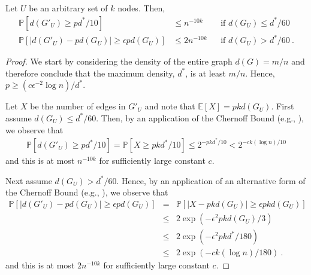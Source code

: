 \documentclass[11pt]{article}
\newcommand{\expec}[1]{\mathbb E\left [ #1 \right ]}
\newcommand{\prob}[1]{\mathbb P \left [ #1 \right ]}
\begin{document}
\begin{lemma}
\label{lem:ld}
Let $U$ be an arbitrary set of $k$ nodes. Then, 
\begin{align*}
\prob{d(G'_U)\geq pd^*/10} & \leq  n^{-10k}    & & \mbox{if $d(G_U)\leq d^*/60$}\\
\prob{|d(G'_U)-pd(G_U)|  \geq  \epsilon p d(G_U) } & \leq  2n^{-10k}     & & \mbox{if $d(G_U)> d^*/60$} \ . 
\end{align*}

\end{lemma}
\begin{proof}
We start by considering the density of the entire graph $d(G)=m/n$ and therefore conclude that the maximum density, $d^*$, is at least $m/n$. Hence, $p\geq  (c \epsilon^{-2} \log n)/d^*$.



Let $X$ be the number of edges in $G'_U$ and note that $\expec{X}= pkd(G_U)$. First assume $d(G_U)\leq d^*/60$. Then, by an application of the Chernoff Bound (e.g., \cite[Theorem 4.4]{MitzenmacherE05}), we observe that
\begin{eqnarray*}
\prob{d(G'_U)\geq  p d^*/10} 
= \prob{X\geq  pkd^*/10} 
\leq  2^{-pkd^*/10} 
<  2^{-c k(\log n)/10} 
\end{eqnarray*}
and this is at most $n^{-10k}$ for sufficiently large constant $c$. 

Next assume $d(G_U)> d^*/60$. Hence, by an application of an alternative form of the Chernoff Bound (e.g., \cite[Theorem 4.4 and 4.5]{MitzenmacherE05}), we observe that
\begin{eqnarray*}
\prob{|d(G'_U)-pd(G_U)| \geq \epsilon pd(G_U) } &=& 
\prob{|X-pkd(G_U)|  \geq  \epsilon pkd(G_U)} \\
& \leq & 2\exp(- \epsilon^2 pkd(G_U)/3)  \\
& \leq & 2\exp(- \epsilon^2 pkd^*/180) \\
& \leq & 2\exp(- ck (\log n) /180) \ .
\end{eqnarray*}
and this is at most $2n^{-10k}$ for sufficiently large constant $c$.
\end{proof}
\end{document}
